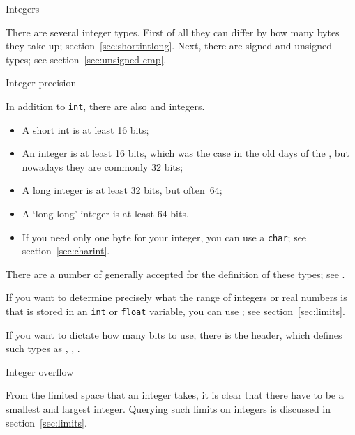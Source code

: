 
 {Integers}
\label{sec:more-ints}

There are several integer types.
First of all they can differ by how many bytes they take up;
section~\ref{sec:shortintlong}.
Next, there are signed and unsigned types;
see section~\ref{sec:unsigned-cmp}.

 {Integer precision}
\label{sec:shortintlong}

In addition to \lstinline{int},
there are also  and  integers.

\begin{itemize}
\item A short int is at least 16 bits;
\item An integer is at least 16 bits, which was the case
  in the old days of the ,
  but nowadays they are commonly 32 bits;
\item A long integer is at least 32 bits, but often~64;
\item A `long long' integer is at least 64 bits.
\item If you need only one byte for your integer, you can use a \lstinline{char};
  see section~\ref{sec:charint}.
\end{itemize}

There are a number of generally accepted 
for the definition of these types; see .

If you want to determine precisely what the range of
integers or real numbers is that is stored in an \lstinline{int} or \lstinline{float}
variable, you can use ; see section~\ref{sec:limits}.

If you want to dictate how many bits to use, there is
the  header, which defines such types
as , , .

 {Integer overflow}

From the limited space that an integer takes, it is clear
that there have to be a smallest and largest integer.
Querying such limits on integers is discussed in section~\ref{sec:limits}.

